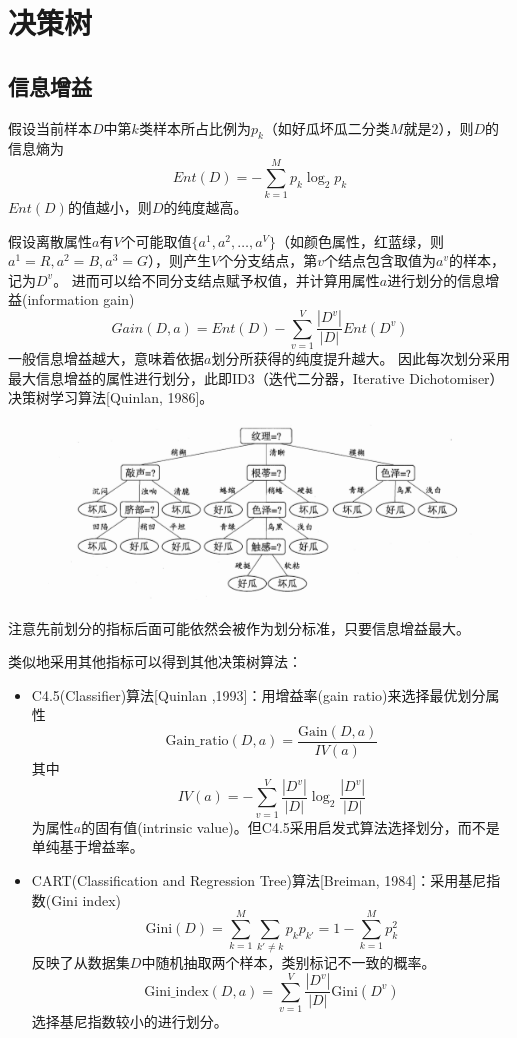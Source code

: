 
\section{决策树}
\subsection{信息增益}
假设当前样本$D$中第$k$类样本所占比例为$p_k$（如好瓜坏瓜二分类$M$就是$2$），则$D$的信息熵为
\[Ent(D)=-\sum_{k=1}^M p_k\log_2 p_k\]
$Ent(D)$的值越小，则$D$的纯度越高。

假设离散属性$a$有$V$个可能取值$\{a^1,a^2,\ldots,a^V\}$（如颜色属性，红蓝绿，则$a^1=R,a^2=B,a^3=G$），则产生$V$个分支结点，第$v$个结点包含取值为$a^v$的样本，记为$D^v$。
进而可以给不同分支结点赋予权值，并计算用属性$a$进行划分的信息增益(information gain)
\[Gain(D,a)=Ent(D)-\sum_{v=1}^V\frac{|D^v|}{|D|}Ent(D^v)\]
一般信息增益越大，意味着依据$a$划分所获得的纯度提升越大。
因此每次划分采用最大信息增益的属性进行划分，此即ID3（迭代二分器，Iterative Dichotomiser）决策树学习算法[Quinlan, 1986]。
\begin{figure}[H]
\centering
\includegraphics[width=0.6\linewidth]{fig/ID3.png}
\end{figure}

注意先前划分的指标后面可能依然会被作为划分标准，只要信息增益最大。

类似地采用其他指标可以得到其他决策树算法：
\begin{itemize}
	\item C4.5(Classifier)算法[Quinlan ,1993]：用增益率(gain ratio)来选择最优划分属性
	\[\text{Gain\_ratio}(D,a)=\frac{\text{Gain}(D,a)}{IV(a)}\]
	其中
	\[IV(a)=-\sum_{v=1}^V\frac{|D^v|}{|D|}\log_2\frac{|D^v|}{|D|}\]
	为属性$a$的固有值(intrinsic value)。但C4.5采用启发式算法选择划分，而不是单纯基于增益率。
	\item CART(Classification and Regression Tree)算法[Breiman, 1984]：采用基尼指数(Gini index)
	\[\text{Gini}(D)=\sum_{k=1}^{M}\sum_{k'\ne k}p_kp_{k'}=1-\sum_{k=1}^Mp_k^2\]
	反映了从数据集$D$中随机抽取两个样本，类别标记不一致的概率。
	\[\text{Gini\_index}(D,a)=\sum_{v=1}^V\frac{|D^v|}{|D|}\text{Gini}(D^v)\]
	选择基尼指数较小的进行划分。
\end{itemize}


